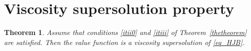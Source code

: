 \documentclass{article}
\newtheorem{theorem}{Theorem}[section]
\theoremstyle{definition}
\numberwithin{equation}{section}
\numberwithin{theorem}{section}
\newcommand{\R}{\mathbb{R}}
\newcommand{\Hb}{\mathbb{H}}
\renewcommand{\r}{R}
\begin{document}
\section{Viscosity supersolution property}
\label{sec:visc-supers-prop}

\begin{theorem}\label{thm3}
Assume that conditions \ref{itii0} and \ref{itiii} of Theorem~\ref{thetheorem} are satisfied. Then the value function is a viscosity supersolution of \eqref{eq_HJB}.
%
%
%
\end{theorem}
\end{document}
